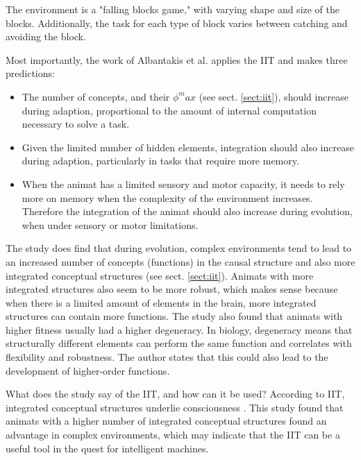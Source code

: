 The environment is a "falling blocks game," with varying shape and size of the blocks. Additionally, the task for each type of block varies between catching and avoiding the block.

Most importantly, the work of Albantakis et al. applies the IIT and makes three predictions:
\begin{itemize}
\item{}
The number of concepts, and their $\phi^max$ (see sect. \vref{sect:iit}), should increase during adaption, proportional to the amount of internal computation necessary to solve a task.
\item{}
Given the limited number of hidden elements, integration should also increase during adaption, particularly in tasks that require more memory.
\item{}
When the animat has a limited sensory and motor capacity, it needs to rely more on memory when the complexity of the environment increases. Therefore the integration of the animat should also increase during evolution, when under sensory or motor limitations.\cite{albantakis_evolution_2014}
\end{itemize}

The study does find that during evolution, complex environments tend to lead to an increased number of concepts (functions) in the causal structure and also more integrated conceptual structures (see sect. \vref{sect:iit}).
Animats with more integrated structures also seem to be more robust, which makes sense because when there is a limited amount of elements in the brain, more integrated structures can contain more functions.
The study also found that animats with higher fitness usually had a higher degeneracy. In biology, degeneracy means that structurally different elements can perform the same function and correlates with flexibility and robustness. The author states that this could also lead to the development of higher-order functions.\cite{albantakis_evolution_2014}

What does the study say of the IIT, and how can it be used? According to IIT, integrated conceptual structures underlie consciousness \cite{tononi_integrated_2016}. This study found that animats with a higher number of integrated conceptual structures found an advantage in complex environments, which may indicate that the IIT can be a useful tool in the quest for intelligent machines.





